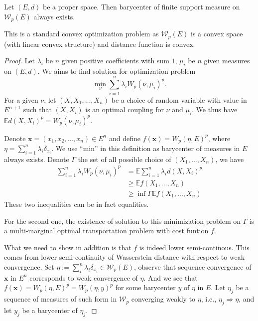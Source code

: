 \begin{thm}
	Let $(E,d)$ be a proper space. Then barycenter of finite support measure on $\mathcal{W}_p(E)$ always exists.
\end{thm}

This is a standard convex optimization problem as $\mathcal{W}_p(E)$ is a convex space (with linear convex structure) and distance function is convex.

\begin{proof}
	Let $\lambda_i$ be $n$ given positive coefficients with sum $1$, $\mu_i$ be $n$ given measures on $(E,d)$. We aims to find solution for optimization problem
	\[
		\min_{\nu} \sum_{i=1}^{n}\lambda_i W_p(\nu, \mu_i)^p.
	\]
	For a given $\nu$, let $(X, X_1,\ldots,X_n)$ be a choice of random variable with value in $E^{n+1}$ such that $(X,X_i)$ is an optimal coupling for $\nu$ and $\mu_i$. We thus have $\mathbb{E}d(X,X_i)^p = W_p(\nu, \mu_i)^p$.

	Denote $\boldsymbol{x}=(x_1, x_2, \ldots, x_n) \in E^n$ and define $f(\boldsymbol{x})= W_p(\eta, E)^p$, where $\eta = \sum_{i=1}^{n} \lambda_i \delta_{x_i}$. We use ``min'' in this definition as barycenter of measures in $E$ always exists. Denote $\Gamma$ the set of all possible choice of $(X_1, \ldots, X_n)$, we have
	\begin{align*}
		\sum_{i=1}^{n}\lambda_i W_p(\nu, \mu_i)^p &= \mathbb{E} \sum_{i=1}^{n}\lambda_i d(X,X_i)^p \\
																						&\geq \mathbb{E} f(X_1, \ldots, X_n)\\
																						&\geq \inf{\Gamma}\mathbb{E} f(X_1, \ldots, X_n)
	\end{align*}
	These two inequalities can be in fact equalities.

		For the second one, the existence of solution to this minimization problem on $\Gamma$ is a multi-marginal optimal transportation problem with cost funtion $f$. 

		What we need to show in addition is that $f$ is indeed lower semi-continous. This comes from lower semi-continuity of Wasserstein distance with respect to weak convergence. Set $\eta:= \sum_i^{n}\lambda_i \delta_{x_i} \in \mathcal{W}_p(E)$, observe that sequence convergence of $\boldsymbol{x}$ in $E^n$ corresponds to weak convergence of $\eta$. And we see that $f(\boldsymbol{x}) = W_p(\eta, E)^p=W_p(\eta, y)^p$ for some barycenter $y$ of $\eta$ in $E$. Let $\eta_j$ be a sequence of measures of such form in $\mathcal{W}_p$ converging weakly to $\eta$, i.e., $\eta_j \Rightarrow \eta$, and let $y_j$ be a barycenter of $\eta_j$.


\end{proof}
